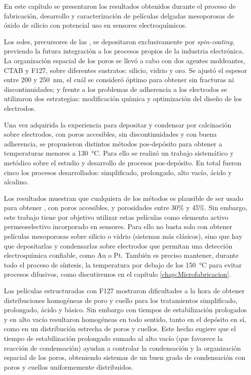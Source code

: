 	En este capítulo se presentaron los resultados obtenidos durante el proceso de fabricación, desarrollo y caracterización de películas delgadas mesoporosas de óxido de silicio con potencial uso en sensores electroquímicos.
	
	Los soles, precursores de las \pdm, se depositaron exclusivamente por \textit{spin-coating}, previendo la futura integración a los procesos propios de la industria electrónica. La organización espacial de los poros se llevó a cabo con dos agentes moldeantes, CTAB y F127, sobre diferentes sustratos: silicio, vidrio y oro. Se ajustó el espesor entre 200 y \SI{250}{\nm}, el cuál se consideró óptimo para obtener \pdm\space sin fracturas ni discontinuidades; y frente a los problemas de adherencia a los electrodos se utilizaron dos estrategias: modificación química y optimización del diseño de los electrodos. 

	Una vez adquirida la experiencia para depositar y condensar por calcinación \pdm\space sobre electrodos, con poros accesibles, sin discontinuidades y con buena adherencia, se propusieron distintos métodos pos-depósito para obtener \pdm\space a temperaturas menores a \SI{130}{\celsius}. Para ello se realizó un trabajo sistemático y metódico sobre el estudio y desarrollo de procesos pos-depósito. En total fueron cinco los procesos desarrollados: simplificado, prolongado, alto vacío, ácido y alcalino.

	Los resultados muestran que cualquiera de los métodos es plausible de ser usado para obtener \pdm, con poros accesibles, y porosidades entre 30\% y 45\%. Sin embargo, este trabajo tiene por objetivo utilizar estas películas como elemento activo permeoselectivo incorporado en sensores. Para ello no basta solo con obtener películas mesoporosas sobre silicio o vidrio (sistemas más clásicos), sino que hay que depositarlas y condensarlas sobre electrodos que permitan una detección electroquímica confiable, como Au o Pt. También es preciso mantener, durante todo el proceso de síntesis, la temperatura por debajo de los \SI{150}{\celsius} para evitar procesos difusivos, como discutiremos en el capítulo \ref{chap:Microfabricacion}.

	Las películas estructuradas con F127 mostraron dificultades a la hora de obtener distribuciones homogéneas de poro y cuello para los tratamientos simplificado, prolongado, ácido y básico. Sin embargo con tiempos de estabilización prologados y en alto vacío resultaron homogéneas en todo sentido, tanto en el depósito en sí, como en un distribución estrecha de poros y cuellos. Este hecho sugiere que el tiempo de estabilización prolongado sumado al alto vacío (que favorece la reacción de condensación) ayudan a controlar la condensación y la organización espacial de los poros, obteniendo sistemas de un buen grado de condensación con poros y cuellos uniformemente distribuidos.

